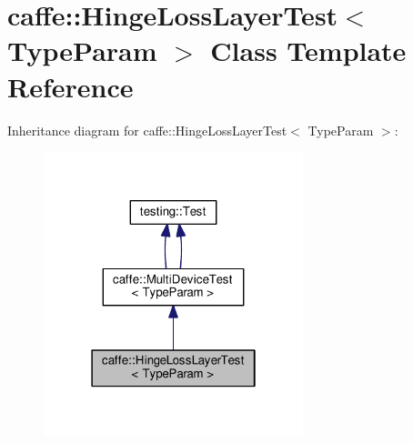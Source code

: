 \hypertarget{classcaffe_1_1_hinge_loss_layer_test}{}\section{caffe\+:\+:Hinge\+Loss\+Layer\+Test$<$ Type\+Param $>$ Class Template Reference}
\label{classcaffe_1_1_hinge_loss_layer_test}


Inheritance diagram for caffe\+:\+:Hinge\+Loss\+Layer\+Test$<$ Type\+Param $>$\+:
\nopagebreak
\begin{figure}[H]
\begin{center}
\leavevmode
\includegraphics[width=214pt]{classcaffe_1_1_hinge_loss_layer_test__inherit__graph}
\end{center}
\end{figure}
